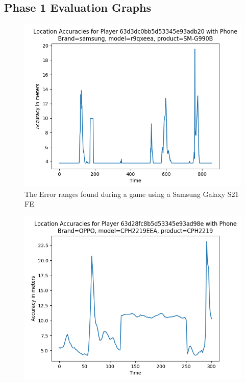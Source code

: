 \documentclass{l4proj}
\begin{document}
%
% 

\begin{appendices}

\chapter{Phase 1 Evaluation Graphs}

\begin{figure}
    \centering
    \includegraphics[width=0.8\linewidth]{images/my_phone.png} 
    \caption{The Error ranges found during a game using a Samsung Galaxy S21 FE}
    \label{fig:galaxys21}
\end{figure}
\begin{figure}
    \centering
    \includegraphics[width=0.8\linewidth]{images/oppo.png}

\end{figure}
\end{appendices}
\end{document}
